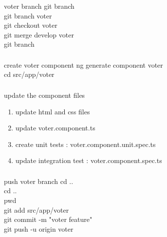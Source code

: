 \documentclass{beamer}
\begin{document}
\begin{frame}\frametitle{} 

\begin{block}{voter branch}
git branch \\
git branch voter \\
git checkout voter \\
git merge develop voter \\
git branch 
\end{block}

\end{frame}


\begin{frame}\frametitle{} 

\begin{block}{create voter component}
ng generate component voter \\
cd src/app/voter \\
\end{block}

\end{frame}




\begin{frame}\frametitle{} 

update the component files

\begin{enumerate}
\item update html and css files
\item update voter.component.ts 
\item create unit tests :        voter.component.unit.spec.ts
\item update integration test :  voter.component.spec.ts
\end{enumerate}


\end{frame}

\begin{frame}\frametitle{} 


\begin{block}{push voter branch}
cd .. \\
cd .. \\
pwd  \\
git add src/app/voter \\
git commit -m "voter feature" \\
git push -u origin voter \\
\end{block}
\end{frame}
\end{document}
